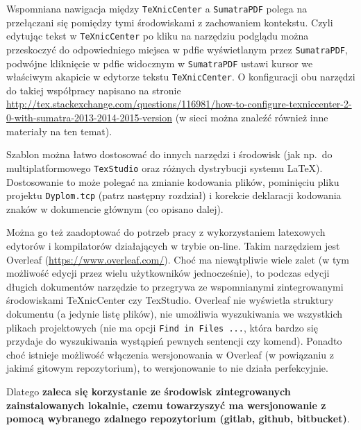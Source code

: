 Wspomniana nawigacja między \texttt{TeXnicCenter} a \texttt{SumatraPDF} polega na przełączani się pomiędzy tymi środowiskami z zachowaniem kontekstu. Czyli edytując tekst w \texttt{TeXnicCenter} po kliku na narzędziu podglądu można przeskoczyć do odpowiedniego miejsca w pdfie wyświetlanym przez \texttt{SumatraPDF}, podwójne kliknięcie w pdfie widocznym w \texttt{SumatraPDF} ustawi kursor we właściwym akapicie w edytorze tekstu \texttt{TeXnicCenter}. O konfiguracji obu narzędzi do takiej współpracy napisano na stronie \url{http://tex.stackexchange.com/questions/116981/how-to-configure-texniccenter-2-0-with-sumatra-2013-2014-2015-version} (w sieci można znaleźć również inne materiały na ten temat).

Szablon można łatwo dostosować do innych narzędzi i środowisk (jak np.\ do multiplatformowego \texttt{TexStudio} oraz różnych dystrybucji systemu LaTeX). Dostosowanie to może polegać na zmianie kodowania plików, pominięciu pliku projektu \texttt{Dyplom.tcp} (patrz następny rozdział) i korekcie deklaracji kodowania znaków w dokumencie głównym (co opisano dalej).

Można go też zaadoptować do potrzeb pracy z wykorzystaniem latexowych edytorów i kompilatorów działających w trybie on-line. Takim narzędziem jest Overleaf (\url{https://www.overleaf.com/}). Choć ma niewątpliwie wiele zalet (w tym możliwość edycji przez wielu użytkowników jednocześnie), to podczas edycji długich dokumentów narzędzie to przegrywa ze wspomnianymi zintegrowanymi środowiskami TeXnicCenter czy TexStudio. Overleaf nie wyświetla struktury dokumentu (a jedynie listę plików), nie umożliwia wyszukiwania we wszystkich plikach projektowych (nie ma opcji  \texttt{Find in Files ...}, która bardzo się przydaje do wyszukiwania wystąpień pewnych sentencji czy komend). Ponadto choć istnieje możliwość włączenia wersjonowania w Overleaf (w powiązaniu z jakimś gitowym repozytorium), to wersjonowanie to nie działa perfekcyjnie.

Dlatego \textbf{zaleca się korzystanie ze środowisk zintegrowanych zainstalowanych lokalnie, czemu towarzyszyć ma wersjonowanie z pomocą wybranego zdalnego repozytorium (gitlab, github, bitbucket)}.


